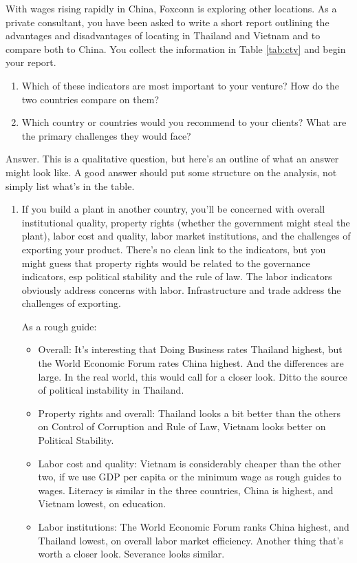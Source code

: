 \begin{enumerate}
With wages rising rapidly in China, Foxconn is exploring other locations.
As a private consultant, you have been asked to write a short report
outlining the advantages and disadvantages of locating in Thailand and Vietnam
and to compare both to China.
You collect the information in Table \ref{tab:ctv} and begin your report.

\begin{enumerate}
\item Which of these indicators are most important to your venture?
How do the two countries compare on them?
\item Which country or countries would you recommend to your clients?
What are the primary challenges they would face?
\end{enumerate}

Answer.
This is a qualitative question, but here's an outline
of what an answer might look like.
A good answer should put some structure on the analysis,
not simply list what's in the table.

\begin{enumerate}
\item If you build a plant in another country, you'll be concerned
with overall institutional quality,
property rights (whether the government might steal the plant),
labor cost and quality,
labor market institutions,
and the challenges of exporting your product.
There's no clean link to the indicators, but you might guess that
property rights would be related to the governance indicators,
esp political stability and the rule of law.
The labor indicators obviously address concerns with labor.
Infrastructure and trade address the challenges of exporting.

As a rough guide:
\begin{itemize}
\item Overall:  It's interesting that Doing Business rates
Thailand highest, but the World Economic Forum rates China highest.
And the differences are large.  In the real world,
this would call for a closer look.
Ditto the source of political instability in Thailand.
\item Property rights and overall:  Thailand looks a bit better than the
others on Control of Corruption and Rule of Law, Vietnam looks better
on Political Stability.
\item Labor cost and quality:  Vietnam is considerably cheaper than the other two,
if we use GDP per capita or the minimum wage as rough guides to wages.
Literacy is similar in the three countries, China is highest, and Vietnam lowest,
on education.
\item Labor institutions:  The World Economic Forum ranks China highest,
and Thailand lowest, on overall labor market efficiency.
Another thing that's worth a closer look.
Severance looks similar.


\end{itemize}
\end{enumerate}
\end{enumerate}
